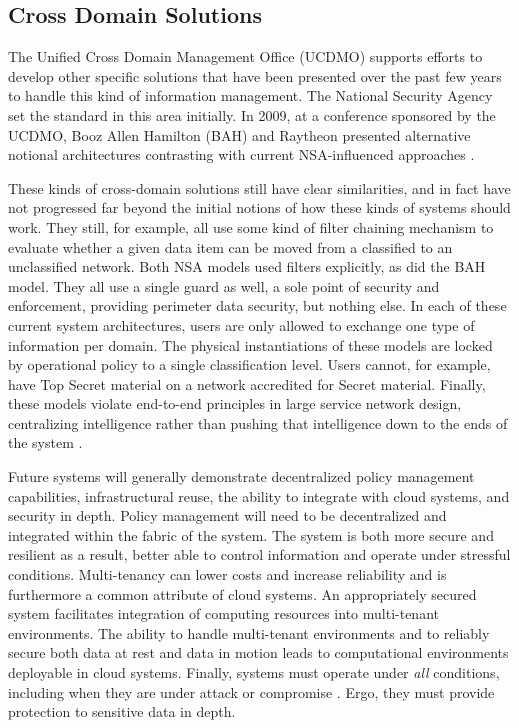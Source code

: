 \subsection{Cross Domain Solutions}
The Unified Cross Domain Management Office (UCDMO) supports efforts to develop other specific solutions that have been presented over the past few years to handle this kind of information management.  The National Security Agency set the standard in this area initially.  In 2009, at a conference sponsored by the UCDMO, Booz Allen Hamilton (BAH) and Raytheon presented alternative notional architectures contrasting with current NSA-influenced approaches \cite{proposal:nsa-arch,proposal:gig-arch,proposal:bah-arch,proposal:raytheon-arch}.

These kinds of cross-domain solutions still have clear similarities, and in fact have not progressed far beyond the initial notions of how these kinds of systems should work.  They still, for example, all use some kind of filter chaining mechanism to evaluate whether a given data item can be moved from a classified to an unclassified network.  Both NSA models used filters explicitly, as did the BAH model.  They all use a single guard as well, a sole point of security and enforcement, providing perimeter data security, but nothing else.  In each of these current system architectures, users are only allowed to exchange one type of information per domain.  The physical instantiations of these models are locked by operational policy to a single classification level.  Users cannot, for example, have Top Secret material on a network accredited for Secret material.  Finally, these models violate end-to-end principles in large service network design, centralizing intelligence rather than pushing that intelligence down to the ends of the system \cite{Blumenthal:2001:RDI:383034.383037}.

Future systems will generally demonstrate decentralized policy management capabilities, infrastructural reuse, the ability to integrate with cloud systems, and security in depth.  Policy management will need to be decentralized and integrated within the fabric of the system.  The system is both more secure and resilient as a result, better able to control information and operate under stressful conditions.  Multi-tenancy can lower costs and increase reliability and is furthermore a common attribute of cloud systems.  An appropriately secured system facilitates integration of computing resources into multi-tenant environments.  The ability to handle multi-tenant environments and to reliably secure both data at rest and data in motion leads to computational environments deployable in cloud systems.  Finally, systems must operate under \textit{all} conditions, including when they are under attack or compromise \cite{proposal:ron-ross}.  Ergo, they must provide protection to sensitive data in depth.

